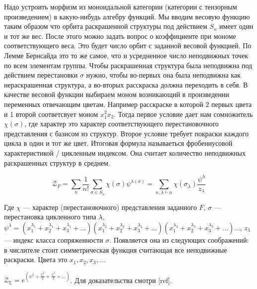 Надо устроить морфизм из моноидальной
категории (категории с тензорным произведением) в какую-нибудь алгебру функций. Мы вводим весовую
функцию таким образом что орбита раскрашенной структуры под действием $S_n$ имеет один и тот же вес.
После этого можно задать вопрос о коэффициенте при мономе соответствующего веса.
Это будет число орбит с заданной весовой функцией. По Лемме Бернсайда это то же
самое, что и усредненное число неподвижных точек по всем элементам группы. Чтобы
раскрашенная структура была неподвижна под действием перестановки $\sigma$
нужно, чтобы во-первых она была неподвижна как нераскрашенная структура, а
во-вторых расскраска должна переходить в себя. В качестве
весовой функции выбираем моном возникающий в произведении переменных отвечающим
цветам. Например расскраске в которой 2 первых цвета и 1 второй
соответсвует моном $x_1^2x_2$. Тогда первое условие дает нам сомножитель
$\chi(\sigma)$, где характер это характер соответствующего перестановочного
представления с базисом из структур. Второе условие требует покраски каждого
цикла в один и тот же цвет. Итоговая формула называеться фробениусовой
характеристикой / цикленным индексом. Она считает количество неподвижных
раскрашенных структур в среднем. 

\begin{equation}
\label{eq:fr}
\mathcal Z_F =
\sum_{n}\frac{1}{n!}\sum_{\sigma \in S_n}\chi(\sigma)\psi^{\lambda(\sigma)} =
\sum_{n, \lambda \vdash n}\chi(\sigma_{\lambda})
\frac{\psi^{\lambda}}{z_{\lambda}}
\end{equation}

Где $\chi$ --- характер (перестановочного) представления заданного $F$, $\sigma$
--- перестановка цикленного типа $\lambda$, 
$\psi^{\lambda} = 
(x_1^{\lambda_1} + x_2^{\lambda_1} + x_3^{\lambda_1} + \dots)
(x_1^{\lambda_2} + x_2^{\lambda_2} + x_3^{\lambda_2} + \dots)
(x_1^{\lambda_3} + x_2^{\lambda_3} + x_3^{\lambda_3} + \dots)
\dots$,
 $z_\lambda$ --- индекс класса сопряженности $\sigma$.
Появляется она из следующих соображений: в числителе стоит симметрическая
функция считающая все неподвижные раскраски. Цвета это $x_1, x_2, x_3, \dots$

\begin{example}
$\mathcal Z_{\mathbb E} = e^{(\psi^1 + \frac{\psi^2}{2} + \frac{\psi^3}{3} +
\dots)}$. Для доказательства смотри [ref].
\end{example}

